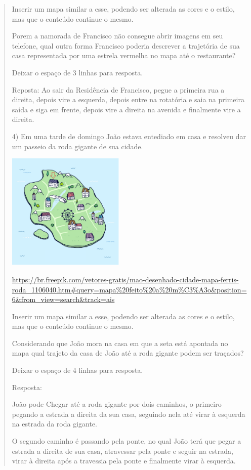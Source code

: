 \begin{quote}
\begin{escolha}
Inserir um mapa similar a esse, podendo ser alterada as cores e o
estilo, mas que o conteúdo continue o mesmo.

Porem a namorada de Francisco não consegue abrir imagens em seu
telefone, qual outra forma Francisco poderia descrever a trajetória de
sua casa representada por uma estrela vermelha no mapa até o
restaurante?

Deixar o espaço de 3 linhas para resposta.

Reposta: Ao sair da Residência de Francisco, pegue a primeira rua a
direita, depois vire a esquerda, depois entre na rotatória e saia na
primeira saída e siga em frente, depois vire a direita na avenida e
finalmente vire a direita.

4) Em uma tarde de domingo João estava entediado em casa e resolveu dar
um passeio da roda gigante de sua cidade.

\includegraphics[width=2.2in,height=2.2in]{./imgSAEB_8_MAT/media/image38.png}

\url{https://br.freepik.com/vetores-gratis/mao-desenhado-cidade-mapa-ferris-roda_1106040.htm\#query=mapa\%20feito\%20a\%20m\%C3\%A3o\&position=6\&from_view=search\&track=ais}

Inserir um mapa similar a esse, podendo ser alterada as cores e o
estilo, mas que o conteúdo continue o mesmo.

Considerando que João mora na casa em que a seta está apontada no mapa
qual trajeto da casa de João até a roda gigante podem ser traçados?

Deixar o espaço de 4 linhas para resposta.

Resposta:

João pode Chegar até a roda gigante por dois caminhos, o primeiro
pegando a estrada a direita da sua casa, seguindo nela até virar à
esquerda na estrada da roda gigante.

O segundo caminho é passando pela ponte, no qual João terá que pegar a
estrada a direita de sua casa, atravessar pela ponte e seguir na
estrada, virar à direita após a travessia pela ponte e finalmente virar
à esquerda.


\end{escolha}
\end{quote}
